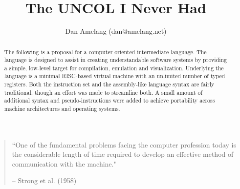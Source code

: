 \documentclass[10pt]{article}
\begin{document}
\twocolumn

\title{The UNCOL I Never Had}
\author{Dan Amelang (dan@amelang.net)}
\maketitle

\begin{quotation}\small
``One of the fundamental problems facing the computer profession today is the considerable
length of time required to develop an effective method of communication with the machine."

-- Strong et al. (1958)
\end{quotation}

\begin{abstract}

The following is a proposal for a computer-oriented intermediate language.
The language is designed to assist in creating understandable
software systems by providing a simple, low-level target for
compilation, emulation and visualization.
Underlying the language is a
minimal RISC-based virtual machine with an unlimited number of typed registers.
Both the instruction set and the assembly-like language syntax are fairly
traditional, though an effort was made to streamline both.
A small amount of additional syntax and pseudo-instructions were added to achieve
portability across machine architectures and operating systems.

\end{abstract}






%



\end{document}
